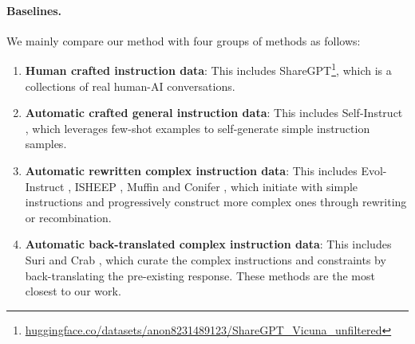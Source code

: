 \paragraph{Baselines.}
We mainly compare our method with four groups of methods as follows:

\begin{enumerate}[itemsep=1mm, parsep=0pt, leftmargin=*]
    \item \textbf{Human crafted instruction data}: This includes ShareGPT\footnote{\url{huggingface.co/datasets/anon8231489123/ShareGPT_Vicuna_unfiltered}}, which is a collections of real human-AI conversations.
    \item \textbf{Automatic crafted general instruction data}: This includes Self-Instruct \cite{wang2022self}, which leverages few-shot examples to self-generate simple instruction samples.
    \item \textbf{Automatic rewritten complex instruction data}: This includes Evol-Instruct \cite{xu2023wizardlm}, ISHEEP \cite{isheep}, Muffin \cite{lou2023muffin} and Conifer \cite{sun2024conifer}, which initiate with simple instructions and progressively construct more complex ones through rewriting or recombination.
    \item \textbf{Automatic back-translated complex instruction data}: This includes Suri \cite{pham2024suri} and Crab \cite{qi2024constraint}, which curate the complex instructions and constraints by back-translating the pre-existing response. These methods are the most closest to our work.
    
\end{enumerate}

